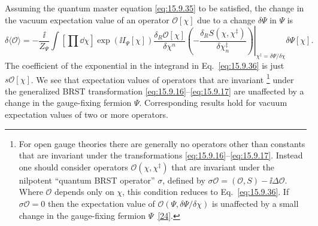 Assuming the quantum master equation \eqref{eq:15.9.35} to be satisfied, the
change in the vacuum expectation value of an operator $\mathcal O[\chi]$ due
to a change $\delta\Psi$ in $\Psi$ is
\begin{equation}
\delta\langle\mathcal O\rangle
=-\frac{\ii}{Z_\Psi}\int\left[\prod \dd\chi\right]
\exp(\ii I_\Psi[\chi])
\frac{\delta_R\mathcal O[\chi]}{\delta\chi^n}
\left.
\left(-\frac{\delta_R S(\chi,\chi^{\ddagger})}
{\delta\chi_n^{\ddagger}}\right)
\right|_{\chi^{\ddagger}=\delta\Psi/\delta\chi}
\delta\Psi[\chi].
\tag{15.9.36}\label{eq:15.9.36}
\end{equation}
The coefficient of the exponential in the integrand in Eq.~\eqref{eq:15.9.36}
is just $s\mathcal O[\chi]$. We see that expectation values of operators that
are invariant
\footnote{For open gauge theories there are generally no operators other than
constants that are invariant under the transformations
\eqref{eq:15.9.16}--\eqref{eq:15.9.17}. Instead one should consider operators
$\mathcal O(\chi,\chi^{\ddagger})$ that are invariant under the nilpotent
``quantum BRST operator'' $\sigma$, defined by
$\sigma\mathcal O=(\mathcal O,S)-\ii\Delta\mathcal O$. Where $\mathcal O$ depends
only on $\chi$, this condition reduces to Eq.~\eqref{eq:15.9.36}. If
$\sigma\mathcal O=0$ then the expectation value of
$\mathcal O(\Psi,\delta\Psi/\delta\chi)$ is unaffected by a small change in
the gauge-fixing fermion $\Psi$~\hyperref[ch15-ref-24]{[24]}.}
under the generalized BRST transformation
\eqref{eq:15.9.16}--\eqref{eq:15.9.17} are unaffected by a change in the
gauge-fixing fermion $\Psi$. Corresponding results hold for vacuum expectation
values of two or more operators.
